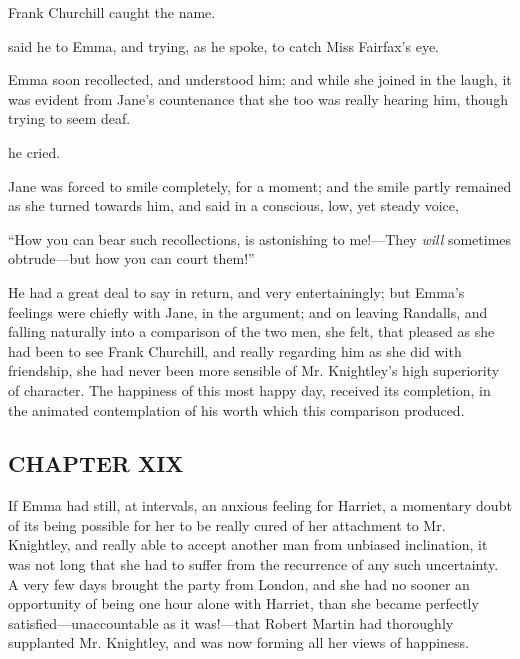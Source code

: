 Frank Churchill caught the name.

 said he to Emma, and trying, as he spoke, to catch Miss Fairfax's eye. 

Emma soon recollected, and understood him; and while she joined in the laugh, it was evident from Jane's countenance that she too was really hearing him, though trying to seem deaf.

 he cried. 

Jane was forced to smile completely, for a moment; and the smile partly remained as she turned towards him, and said in a conscious, low, yet steady voice,

“How you can bear such recollections, is astonishing to me!---They {\em will} sometimes obtrude---but how you can court them!”

He had a great deal to say in return, and very entertainingly; but Emma's feelings were chiefly with Jane, in the argument; and on leaving Randalls, and falling naturally into a comparison of the two men, she felt, that pleased as she had been to see Frank Churchill, and really regarding him as she did with friendship, she had never been more sensible of Mr. Knightley's high superiority of character. The happiness of this most happy day, received its completion, in the animated contemplation of his worth which this comparison produced.

\subsection[chapter-xix]{\useURL[url57][][][]\from[url57]CHAPTER XIX}

If Emma had still, at intervals, an anxious feeling for Harriet, a momentary doubt of its being possible for her to be really cured of her attachment to Mr. Knightley, and really able to accept another man from unbiased inclination, it was not long that she had to suffer from the recurrence of any such uncertainty. A very few days brought the party from London, and she had no sooner an opportunity of being one hour alone with Harriet, than she became perfectly satisfied---unaccountable as it was!---that Robert Martin had thoroughly supplanted Mr. Knightley, and was now forming all her views of happiness.

